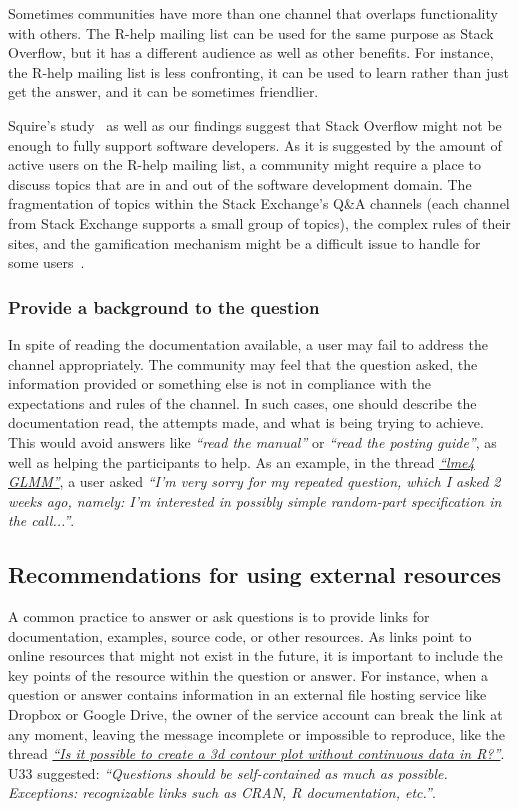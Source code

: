 \documentclass{sig-alternate-05-2015}
\begin{document}
		Sometimes communities have more than one channel that overlaps functionality with others.
		The R-help mailing list can be used for the same purpose as Stack Overflow, but it has a different audience as well as other benefits.
		For instance, the R-help mailing list is less confronting, it can be used to learn rather than just get the answer, and it can be sometimes friendlier.

Squire's study~\cite{Squire2015a} as well as our findings suggest that Stack Overflow might not be enough to fully support software developers.
As it is suggested by the amount of active users on the R-help mailing list, a community might require a place to discuss topics that are in and out of the software development domain.
The fragmentation of topics within the Stack Exchange's Q\&A channels (each channel from Stack Exchange supports a small group of topics), the complex rules of their sites, and the gamification mechanism might be a difficult issue to handle for some users~\cite{Vasilescu2013}.

	\subsubsection{Provide a background to the question}

In spite of reading the documentation available, a user may fail to address the channel appropriately.
The community may feel that the question asked, the information provided or something else is not in compliance with the expectations and rules of the channel.
In such cases, one should describe the documentation read, the attempts made, and what is being trying to achieve.
This would avoid answers like \textit{``read the manual''} or \textit{``read the posting guide''}, as well as helping the participants to help.
As an example, in the thread \textit{\href{https://goo.gl/Gbek3R}{``lme4 GLMM''}}, a user asked \textit{``I'm very sorry for my repeated question, which I asked 2 weeks ago, namely: I'm interested in possibly simple random-part specification in the call...''}.

\subsection{Recommendations for using external resources}

A common practice to answer or ask questions is to provide links for documentation, examples, source code, or other resources.
	As links point to online resources that might not exist in the future, it is important to include the key points of the resource within the question or answer.
	For instance, when a question or answer contains information in an external file hosting service like Dropbox or Google Drive, the owner of the service account can break the link at any moment, leaving the message incomplete or impossible to reproduce, like the thread \textit{\href{http://goo.gl/5nanFU}{``Is it possible to create a 3d contour plot without continuous data in R?''}}.
	U33 suggested: \textit{``Questions should be self-contained as much as possible. Exceptions: recognizable links such as CRAN, R documentation, etc.''}.
\end{document}
